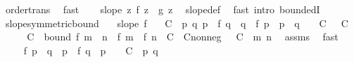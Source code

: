 \begin{isabellebody}
\ order{\isacharunderscore}{\kern0pt}trans\ \isamarkupfalse%
\ fast\isanewline
\ \ \isamarkupfalse%
\ {\isachardoublequoteopen}slope\ {\isacharparenleft}{\kern0pt}{\isasymlambda}z{\isachardot}{\kern0pt}\ f\ z\ {\isacharplus}{\kern0pt}\ g\ z{\isacharparenright}{\kern0pt}{\isachardoublequoteclose}\ \isamarkupfalse%
\ slope{\isacharunderscore}{\kern0pt}def\ \isamarkupfalse%
\ {\isacharparenleft}{\kern0pt}fast\ intro{\isacharcolon}{\kern0pt}\ boundedI{\isacharparenright}{\kern0pt}\isanewline
{}\isamarkupfalse%
%
\endisatagproof
{\isafoldproof}%
%
\isadelimproof
\isanewline
%
\endisadelimproof
\isanewline
{}\isamarkupfalse%
\ slope{\isacharunderscore}{\kern0pt}symmetric{\isacharunderscore}{\kern0pt}bound{\isacharcolon}{\kern0pt}\isanewline
\ \ \ {\isachardoublequoteopen}slope\ f{\isachardoublequoteclose}\isanewline
\ \ \ C\ \ {\isachardoublequoteopen}{\isasymAnd}p\ q{\isachardot}{\kern0pt}\ {\isasymbar}p\ {\isacharasterisk}{\kern0pt}\ f\ q\ {\isacharminus}{\kern0pt}\ q\ {\isacharasterisk}{\kern0pt}\ f\ p{\isasymbar}\ {\isasymle}\ {\isacharparenleft}{\kern0pt}{\isasymbar}p{\isasymbar}\ {\isacharplus}{\kern0pt}\ {\isasymbar}q{\isasymbar}\ {\isacharplus}{\kern0pt}\ {}{\isacharparenright}{\kern0pt}\ {\isacharasterisk}{\kern0pt}\ C{\isachardoublequoteclose}\ {\isachardoublequoteopen}{}\ {\isasymle}\ C{\isachardoublequoteclose}\isanewline
%
\isadelimproof
%
\endisadelimproof
%
\isatagproof
{}\isamarkupfalse%
\ {\isacharminus}{\kern0pt}\isanewline
\ \ \isamarkupfalse%
\ C\ \ bound{\isacharcolon}{\kern0pt}\ {\isachardoublequoteopen}{\isasymbar}f\ {\isacharparenleft}{\kern0pt}m\ {\isacharplus}{\kern0pt}\ n{\isacharparenright}{\kern0pt}\ {\isacharminus}{\kern0pt}\ {\isacharparenleft}{\kern0pt}f\ m\ {\isacharplus}{\kern0pt}\ f\ n{\isacharparenright}{\kern0pt}{\isasymbar}\ {\isasymle}\ C{\isachardoublequoteclose}\ \ C{\isacharunderscore}{\kern0pt}nonneg{\isacharcolon}{\kern0pt}\ {\isachardoublequoteopen}{}\ {\isasymle}\ C{\isachardoublequoteclose}\ \ m\ n\ \isamarkupfalse%
\ assms\ \isamarkupfalse%
\ fast\isanewline
\ \ \isanewline
\ \ \isamarkupfalse%
\ {\isacharasterisk}{\kern0pt}{\isacharcolon}{\kern0pt}\ {\isachardoublequoteopen}{\isasymbar}f\ {\isacharparenleft}{\kern0pt}p\ {\isacharasterisk}{\kern0pt}\ q{\isacharparenright}{\kern0pt}\ {\isacharminus}{\kern0pt}\ p\ {\isacharasterisk}{\kern0pt}\ f\ q{\isasymbar}\ {\isasymle}\ {\isacharparenleft}{\kern0pt}{\isasymbar}p{\isasymbar}\ {\isacharplus}{\kern0pt}\ {}{\isacharparenright}{\kern0pt}\ {\isacharasterisk}{\kern0pt}\ C{\isachardoublequoteclose}\ \ p\ q\isanewline

\end{isabellebody}

